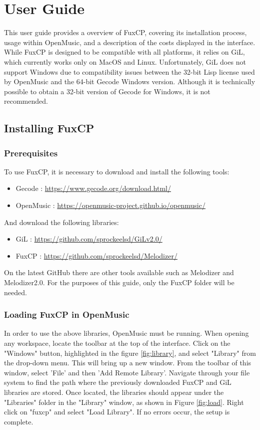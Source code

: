 \chapter{User Guide}\label{chapter:user-guide}
This user guide provides a overview of FuxCP, covering its installation process, usage within OpenMusic, and a description of the costs displayed in the interface. While FuxCP is designed to be compatible with all platforms, it relies on GiL, which currently works only on MacOS and Linux. Unfortunately, GiL does not support Windows due to compatibility issues between the 32-bit Lisp license used by OpenMusic and the 64-bit Gecode Windows version. Although it is technically possible to obtain a 32-bit version of Gecode for Windows, it is not recommended. 

\section{Installing FuxCP}
\subsection{Prerequisites}
To use FuxCP, it is necessary to download and install the following tools:
\begin{itemize}
    \item Gecode : \url{https://www.gecode.org/download.html/}
    \item OpenMusic : \url{https://openmusic-project.github.io/openmusic/}
\end{itemize}

And download the following libraries:
\begin{itemize}
    \item GiL : \url{https://github.com/sprockeelsd/GiLv2.0/}
    \item FuxCP : \url{https://github.com/sprockeelsd/Melodizer/}
\end{itemize}
On the latest GitHub there are other tools available such as Melodizer and Melodizer2.0. For the purposes of this guide, only the FuxCP folder will be needed.

\subsection{Loading FuxCP in OpenMusic}
In order to use the above libraries, OpenMusic must be running. When opening any workspace, locate the toolbar at the top of the interface. Click on the "Windows" button, highlighted in the figure \ref{fig:library}, and select "Library" from the drop-down menu. This will bring up a new window. From the toolbar of this window, select 'File' and then 'Add Remote Library'. Navigate through your file system to find the path where the previously downloaded FuxCP and GiL libraries are stored. Once located, the libraries should appear under the "Libraries" folder in the "Library" window, as shown in Figure \ref{fig:load}. Right click on "fuxcp" and select "Load Library". If no errors occur, the setup is complete.

